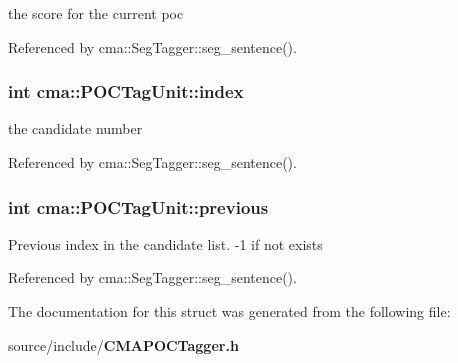 the score for the current poc 

Referenced by cma::SegTagger::seg\_\-sentence().
\subsubsection{\setlength{\rightskip}{0pt plus 5cm}int {\bf cma::POCTagUnit::index}}\label{structcma_1_1POCTagUnit_408429985543c203e36a6e8c6921935c}


the candidate number 

Referenced by cma::SegTagger::seg\_\-sentence().
\subsubsection{\setlength{\rightskip}{0pt plus 5cm}int {\bf cma::POCTagUnit::previous}}\label{structcma_1_1POCTagUnit_65a1e27d97dfa822fee58fbe3dc2a2a3}


Previous index in the candidate list. -1 if not exists 

Referenced by cma::SegTagger::seg\_\-sentence().

The documentation for this struct was generated from the following file:\begin{CompactItemize}
\item 
source/include/{\bf CMAPOCTagger.h}\end{CompactItemize}
